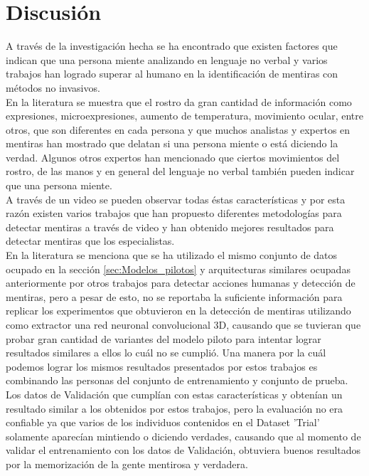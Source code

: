 \chapter{Discusión} %
\label{Chapter5} %
\begin{onehalfspacing}

A través de la investigación hecha se ha encontrado que existen factores que indican que una persona miente analizando en lenguaje no verbal y varios trabajos han logrado superar al humano en la identificación de mentiras con métodos no invasivos.\\

En la literatura se muestra que el rostro da gran cantidad de información como expresiones, microexpresiones, aumento de temperatura, movimiento ocular, entre otros, que son diferentes en cada persona y que muchos analistas y expertos en mentiras han mostrado que delatan si una persona miente o está diciendo la verdad. Algunos otros expertos han mencionado que ciertos movimientos del rostro, de las manos y en general del lenguaje no verbal también pueden indicar que una persona miente.\\

A través de un video se pueden observar todas éstas características y por esta razón existen varios trabajos que han propuesto diferentes metodologías para detectar mentiras a través de video y han obtenido mejores resultados para detectar mentiras que los especialistas.\\




En la literatura se menciona que se ha utilizado el mismo conjunto de datos ocupado en la sección \ref{sec:Modelos_pilotos} y arquitecturas similares ocupadas anteriormente por otros trabajos para detectar acciones humanas y detección de mentiras, pero a pesar de esto, no se reportaba la suficiente información para replicar los experimentos que obtuvieron en la detección de mentiras utilizando como extractor una red neuronal convolucional 3D, causando que se tuvieran que probar gran cantidad de variantes del modelo piloto para intentar lograr resultados similares a ellos lo cuál no se cumplió. Una manera por la cuál podemos lograr los mismos resultados presentados por estos trabajos es combinando las personas del conjunto de entrenamiento y conjunto de prueba. Los datos de Validación que cumplían con estas características y obtenían un resultado similar a los obtenidos por estos trabajos, pero la evaluación no era confiable ya que varios de los individuos contenidos en el Dataset 'Trial' solamente aparecían mintiendo o diciendo verdades, causando que al momento de validar el entrenamiento con los datos de Validación, obtuviera buenos resultados por la memorización de la gente mentirosa y verdadera.\\


\end{onehalfspacing}
